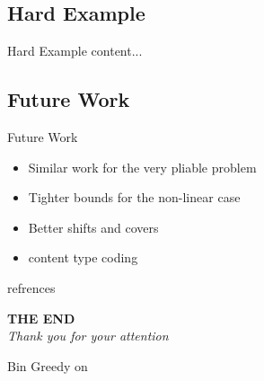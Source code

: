 \documentclass[xcolor=dvipsnames, aspectratio=169]{beamer}
\begin{document}
\subsection{Hard Example}
\begin{frame}{Hard Example}
	content...
\end{frame}
\subsection{Future Work}
\begin{frame}{Future Work}
	\begin{itemize}
		\item<1-> Similar work for the very pliable problem
		\item<2-> Tighter bounds for the non-linear case
		\item<3-> Better shifts and covers
		\item<4-> content type coding
		
	\end{itemize}
\end{frame}




\begin{frame}{refrences}
	\printbibliography
	
\end{frame}
\begin{frame}
    \centering
    \vspace{1cm}
    \hspace{2cm}  \textbf{\Huge{THE END}} \\
    \vspace{0.5cm}
    \textit{\Large{Thank you for your attention}}
\end{frame}


\begin{frame}{Bin Greedy}
	on
\end{frame}
%         
\end{document}
